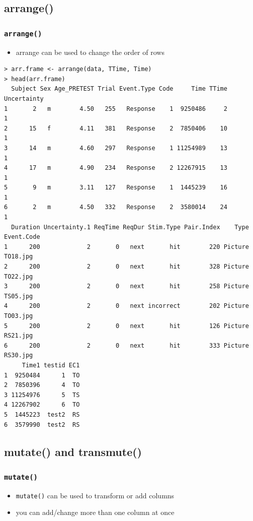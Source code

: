 \documentclass[xcolor={table},c]{beamer}
\begin{document}
\subsection{arrange()}
\begin{frame}[fragile]\frametitle{\texttt{arrange()}}
  \begin{itemize}
  \item arrange can be used to change the order of rows
  \end{itemize}\tiny
\begin{verbatim}
> arr.frame <- arrange(data, TTime, Time)
> head(arr.frame)
  Subject Sex Age_PRETEST Trial Event.Type Code     Time TTime Uncertainty
1       2   m        4.50   255   Response    1  9250486     2           1
2      15   f        4.11   381   Response    2  7850406    10           1
3      14   m        4.60   297   Response    1 11254989    13           1
4      17   m        4.90   234   Response    2 12267915    13           1
5       9   m        3.11   127   Response    1  1445239    16           1
6       2   m        4.50   332   Response    2  3580014    24           1
  Duration Uncertainty.1 ReqTime ReqDur Stim.Type Pair.Index    Type Event.Code
1      200             2       0   next       hit        220 Picture   TO18.jpg
2      200             2       0   next       hit        328 Picture   TO22.jpg
3      200             2       0   next       hit        258 Picture   TS05.jpg
4      200             2       0   next incorrect        202 Picture   TO03.jpg
5      200             2       0   next       hit        126 Picture   RS21.jpg
6      200             2       0   next       hit        333 Picture   RS30.jpg
     Time1 testid EC1
1  9250484      1  TO
2  7850396      4  TO
3 11254976      5  TS
4 12267902      6  TO
5  1445223  test2  RS
6  3579990  test2  RS  
\end{verbatim}
\end{frame}


\subsection{mutate() and transmute()}
\begin{frame}[fragile]\frametitle{\texttt{mutate()}}
  \begin{itemize}
  \item \texttt{mutate()} can be used to transform or add columns
  \item you can add/change more than one column at once
  \end{itemize}
\end{frame}
\end{document}
